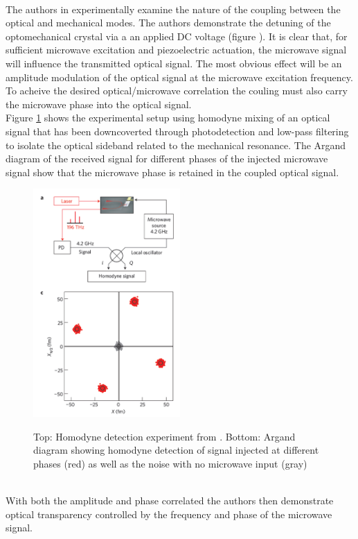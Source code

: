 \documentclass[a4paper,11pt, twocolumn]{article}
\numberwithin{equation}{section}
\begin{document}
\\
The authors in \cite{nanoCrystal} experimentally examine the nature of the coupling between the optical and mechanical modes.
The authors demonstrate the detuning of the optomechanical crystal via a an applied DC voltage (figure ).
It is clear that, for sufficient microwave excitation and piezoelectric actuation, the microwave signal will influence the transmitted optical signal.
The most obvious effect will be an amplitude modulation of the optical signal at the microwave excitation frequency.
To acheive the desired optical/microwave correlation the couling must also carry the microwave phase into the optical signal.
\\
Figure \ref{fig:homodyne} shows the experimental setup using homodyne mixing of an optical signal that has been downcoverted through photodetection and low-pass filtering to isolate the optical sideband related to the mechanical resonance.
The Argand diagram of the received signal for different phases of the injected microwave signal show that the microwave phase is retained in the coupled optical signal.
\begin{figure}
 \caption{Top: Homodyne detection experiment from \cite{nanoCrystal}. Bottom: Argand diagram showing homodyne detection of signal injected at different phases (red) as well as the noise with no microwave input (gray) }
 \centering
   \includegraphics[width=0.5\textwidth]{figs/CrystalMixing}
 \label{fig:homodyne}
\end{figure}
\\
With both the amplitude and phase correlated the authors then demonstrate optical transparency controlled by the frequency and phase of the microwave signal. 
\end{document}
